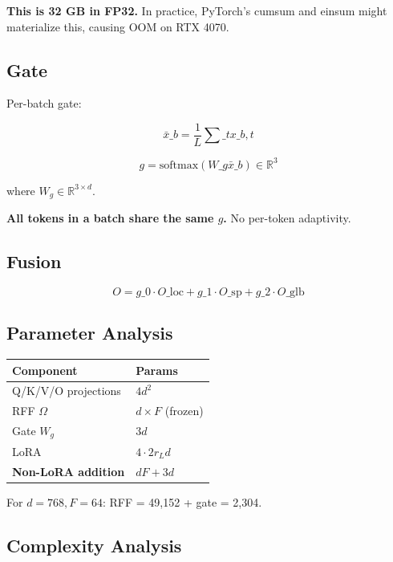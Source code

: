 \textbf{This is 32 GB in FP32.} In practice, PyTorch's cumsum and einsum might 
materialize this, causing OOM on RTX 4070.

\subsection{Gate}

Per-batch gate:

\[
\bar{x}\_b = \frac{1}{L} \sum\_t x\_{b,t}
\tag{4.13}
\]

\[
g = \text{softmax}(W\_g \bar{x}\_b) \in \mathbb{R}^3
\tag{4.14}
\]

where $W_g \in \mathbb{R}^{3 \times d}$.

\textbf{All tokens in a batch share the same $g$.} No per-token adaptivity.

\subsection{Fusion}

\[
O = g\_0 \cdot O\_{\text{loc}} + g\_1 \cdot O\_{\text{sp}} + g\_2 \cdot O\_{\text{glb}}
\tag{4.15}
\]

\subsection{Parameter Analysis}

\begin{table}[H]
\centering
\small
\begin{tabular}{ll}
\toprule
\textbf{Component} & \textbf{Params} \\
\midrule
Q/K/V/O projections & $4 d^2$ \\
RFF $\Omega$ & $d \times F$ (frozen) \\
Gate $W_g$ & $3 d$ \\
LoRA & $4 \cdot 2 r_L d$ \\
\textbf{Non-LoRA addition} & $d F + 3d$ \\
\bottomrule
\end{tabular}
\end{table}

For $d = 768, F = 64$: RFF = 49,152 + gate = 2,304.

\subsection{Complexity Analysis}

